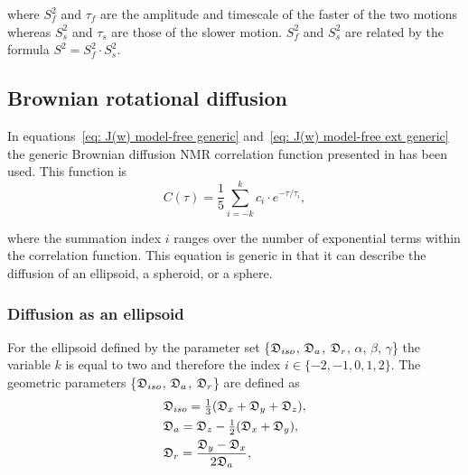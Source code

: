 \noindent where $S^2_f$ and $\tau_f$ are the amplitude and timescale of the faster of the two motions whereas $S^2_s$ and $\tau_s$ are those of the slower motion.  $S^2_f$ and $S^2_s$ are related by the formula $S^2 = S^2_f \cdot S^2_s$.



\subsection{Brownian rotational diffusion}

In equations~\eqref{eq: J(w) model-free generic} and~\eqref{eq: J(w) model-free ext generic} the generic Brownian diffusion NMR correlation function presented in \citet{dAuvergneGooley06b} has been used.  This function is
\begin{equation} \label{eq: C(tau) generic}
    C(\tau) = \frac{1}{5} \sum_{i=-k}^k c_i \cdot e^{-\tau/\tau_i},
\end{equation}

\noindent where the summation index $i$ ranges over the number of exponential terms within the correlation function.  This equation is generic in that it can describe the diffusion of an ellipsoid, a spheroid, or a sphere.



\subsubsection{Diffusion as an ellipsoid}

For the ellipsoid defined by the parameter set \{$\mathfrak{D}_{iso}$, $\mathfrak{D}_a$, $\mathfrak{D}_r$, $\alpha$, $\beta$, $\gamma$\} the variable $k$ is equal to two and therefore the index $i \in \{-2, -1, 0, 1, 2\}$.  The geometric parameters \{$\mathfrak{D}_{iso}$, $\mathfrak{D}_a$, $\mathfrak{D}_r$\} are defined as
\begin{subequations}
\begin{align}
    & \mathfrak{D}_{iso} = \tfrac{1}{3} (\mathfrak{D}_x + \mathfrak{D}_y + \mathfrak{D}_z ),   \label{eq: Diso ellipsoid def} \\
    & \mathfrak{D}_a = \mathfrak{D}_z - \tfrac{1}{2}(\mathfrak{D}_x + \mathfrak{D}_y),         \label{eq: Da ellipsoid def} \\
    & \mathfrak{D}_r = \frac{\mathfrak{D}_y - \mathfrak{D}_x}{2\mathfrak{D}_a},                \label{eq: Dr ellipsoid def}
\end{align}
\end{subequations}

